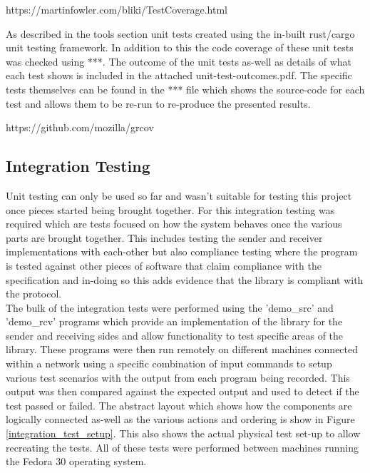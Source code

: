\documentclass[11pt,a4paper]{report}
\begin{document}
	https://martinfowler.com/bliki/TestCoverage.html
	
	As described in the tools section unit tests created using the in-built rust/cargo unit testing framework. In addition to this the code coverage of these unit tests was checked using ***. The outcome of the unit tests as-well as details of what each test shows is included in the attached unit-test-outcomes.pdf. The specific tests themselves can be found in the *** file which shows the source-code for each test and allows them to be re-run to re-produce the presented results.
	
	https://github.com/mozilla/grcov
	
	\subsection{Integration Testing}
	Unit testing can only be used so far and wasn't suitable for testing this project once pieces started being brought together. For this integration testing was required which are tests focused on how the system behaves once the various parts are brought together. This includes testing the sender and receiver implementations with each-other but also compliance testing where the program is tested against other pieces of software that claim compliance with the specification and in-doing so this adds evidence that the library is compliant with the protocol.\\
	
	The bulk of the integration tests were performed using the 'demo\_src' and 'demo\_rcv' programs which provide an implementation of the library for the sender and receiving sides and allow functionality to test specific areas of the library. These programs were then run remotely on different machines connected within a network using a specific combination of input commands to setup various test scenarios with the output from each program being recorded. This output was then compared against the expected output and used to detect if the test passed or failed. The abstract layout which shows how the components are logically connected as-well as the various actions and ordering is show in Figure \ref{integration_test_setup}. This also shows the actual physical test set-up to allow recreating the tests. All of these tests were performed between machines running the Fedora 30 operating system. \\
	
\end{document}
